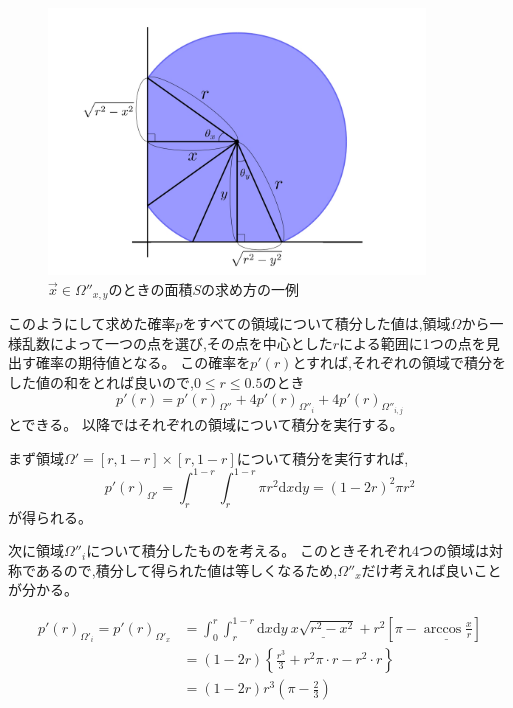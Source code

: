 \begin{figure}[H]
    \begin{center}
        \includegraphics[width=10cm]{../img/omega_xy.jpg}
        \caption{$\vec{x} \in \Omega''_{x,y}$のときの面積$S$の求め方の一例}
        \label{fig:f22}
    \end{center}
\end{figure}

このようにして求めた確率$p$をすべての領域について積分した値は,領域$\Omega$から一様乱数によって一つの点を選び,その点を中心とした$r$による範囲に1つの点を見出す確率の期待値となる。
この確率を$p'(r)$とすれば,それぞれの領域で積分をした値の和をとれば良いので,$0\le r \le 0.5$のとき
\[p'(r) = p'(r)_{\Omega''} + 4p'(r)_{\Omega''_{i}} + 4p'(r)_{\Omega''_{i,j}}\]
とできる。
以降ではそれぞれの領域について積分を実行する。

まず領域$\Omega' = [r, 1-r]\times [r , 1-r]$について積分を実行すれば,
\begin{equation}
p'(r)_{\Omega'} = \int_{r}^{1-r} \int_{r}^{1-r}\pi r^{2}\mathrm{d}x\mathrm{d}y = (1-2r)^{2}\pi r^{2}
\label{eq:e10}
\end{equation}
が得られる。

次に領域$\Omega''_{i}$について積分したものを考える。
このときそれぞれ4つの領域は対称であるので,積分して得られた値は等しくなるため,$\Omega''_{x}$だけ考えれば良いことが分かる。

\begin{align}
p'(r)_{\Omega'_{i}} = p'(r)_{\Omega'_{x}} &= \int_{0}^{r} \int_{r}^{1-r}\mathrm{d}x\mathrm{d}y\ \underline{x\sqrt{r^{2}-x^{2}}} + r^{2}\left[\pi - \underline{\arccos\frac{x}{r}}\right]\nonumber \\
&= (1-2r)\left\{ \frac{r^{3}}{3} + r^{2}\pi\cdot r - r^{2}\cdot r \right\}\nonumber \\
&= (1-2r)r^{3}\left( \pi-\frac{2}{3} \right)
\label{eq:e11}
\end{align}

